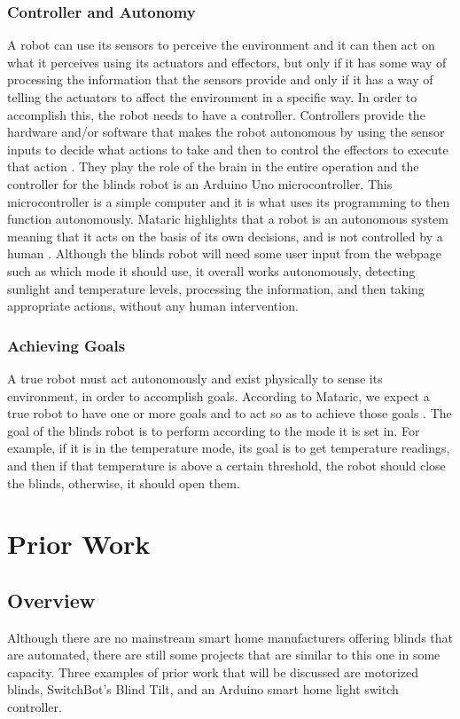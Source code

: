 \documentclass[10pt,twocolumn]{article}
\begin{document}
\subsubsection{Controller and Autonomy}
A robot can use its sensors to perceive the environment and it can then act on what it perceives using its actuators and effectors, but only if it has some way of processing the information that the sensors provide and only if it has a way of telling the actuators to affect the environment in a specific way. In order to accomplish this, the robot needs to have a controller. Controllers provide the hardware and/or software that makes the robot autonomous by using the sensor inputs to decide what actions to take and then to control the effectors to execute that action \cite{Mataric2007TheRoboticsPrimer}. They play the role of the brain in the entire operation and the controller for the blinds robot is an Arduino Uno microcontroller. This microcontroller is a simple computer and it is what uses its programming to then function autonomously. Mataric highlights that a robot is an autonomous system meaning that it acts on the basis of its own decisions, and is not controlled by a human \cite{Mataric2007TheRoboticsPrimer}. Although the blinds robot will need some user input from the webpage such as which mode it should use, it overall works autonomously, detecting sunlight and temperature levels, processing the information, and then taking appropriate actions, without any human intervention.

\subsubsection{Achieving Goals}
A true robot must act autonomously and exist physically to sense its environment, in order to accomplish goals. According to Mataric, we expect a true robot to have one or more goals and to act so as to achieve those goals \cite{Mataric2007TheRoboticsPrimer}. The goal of the blinds robot is to perform according to the mode it is set in. For example, if it is in the temperature mode, its goal is to get temperature readings, and then if that temperature is above a certain threshold, the robot should close the blinds, otherwise, it should open them.


\section{Prior Work}
\subsection{Overview}
Although there are no mainstream smart home manufacturers offering blinds that are automated, there are still some projects that are similar to this one in some capacity. Three examples of prior work that will be discussed are motorized blinds, SwitchBot’s Blind Tilt, and an Arduino smart home light switch controller. 
\end{document}
